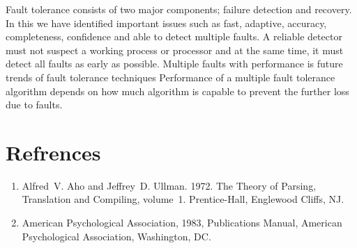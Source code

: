 \documentclass{article}
\begin{document}
Fault tolerance consists of two major components; failure detection and recovery. In this we have identified important issues such as fast, adaptive, accuracy, completeness, confidence and able to detect multiple faults. A reliable detector must not suspect a working process or processor and at the same time, it must detect all faults as early as possible. Multiple faults with performance is future trends of fault tolerance techniques Performance of a multiple fault tolerance algorithm depends on how much algorithm is capable to prevent the further loss due to faults.

\section{Refrences}
\begin{enumerate}
  \item Alfred~V. Aho and Jeffrey~D. Ullman. 1972. The Theory of Parsing, Translation and Compiling, volume~1. Prentice-Hall, Englewood Cliffs, NJ.
  \item American Psychological Association, 1983, Publications Manual, American Psychological Association, Washington, DC.
\end{enumerate}
\end{document}
